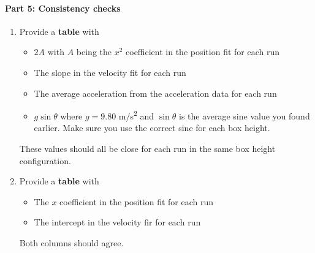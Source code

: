 \paragraph{Part 5: Consistency checks}
%
\begin{enumerate}
    \item Provide a \textbf{table} with
    \begin{itemize}
        \item $2A$ with $A$ being the $x^{2}$ coefficient in the position fit for each run
        \item The slope in the velocity fit for each run
        \item The average acceleration from the acceleration data for each run
        \item $g \sin \theta$ where $g = 9.80$ m/s\textsuperscript{2} and $\sin \theta$ is the average sine value you found earlier. Make sure you use the correct sine for each box height.
    \end{itemize}
    These values should all be close for each run in the same box height configuration.
    \item Provide a \textbf{table} with
    \begin{itemize}
        \item The $x$ coefficient in the position fit for each run
        \item The intercept in the velocity fir for each run
    \end{itemize}
    Both columns should agree.
\end{enumerate}
%
